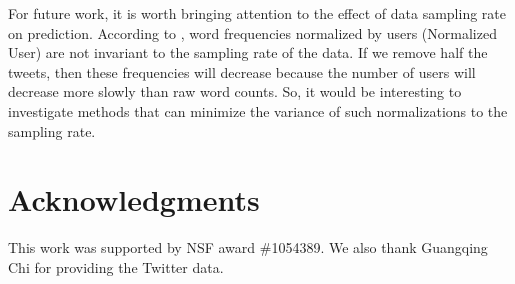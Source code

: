 \documentclass[letterpaper]{article}
\begin{document}
For future work, it is worth bringing attention to the effect of data sampling rate on prediction. According to \citeauthor{eisenstein2014diffusion} , word frequencies normalized by users (Normalized User) are not invariant to the sampling rate of the data. If we remove half the tweets, then these frequencies will decrease because the number of users will decrease more slowly than raw word counts. So, it would be interesting to investigate methods that can minimize the variance of such normalizations to the sampling rate.

\section{Acknowledgments}
This work was supported by NSF award \#1054389. We also thank Guangqing Chi for providing the Twitter data.


\fontsize{9.0pt}{10.0pt}
\selectfont


\end{document}
